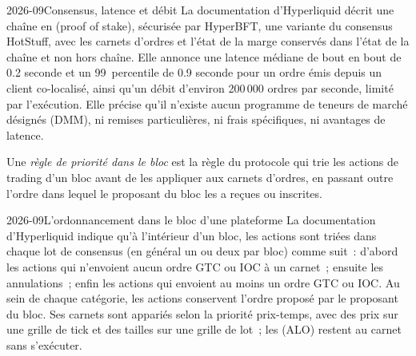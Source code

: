 \begin{dated}{2026-09}{Consensus, latence et débit}\label{dat:m3:on-chain-order-books-and-perpetual-dexs:hl}
La documentation d'Hyperliquid décrit une chaîne en  (proof of stake), sécurisée par HyperBFT, une variante du consensus
HotStuff, avec les carnets d'ordres et l'état de la marge conservés dans l'état de la chaîne et non hors chaîne. Elle annonce une latence médiane
de bout en bout de 0.2 seconde et un 99~percentile de 0.9 seconde pour un ordre émis depuis un client co-localisé, ainsi qu'un
débit d'environ 200\,000 ordres par seconde, limité par l'exécution. Elle précise qu'il n'existe aucun programme de teneurs
de marché désignés (DMM), ni remises particulières, ni frais spécifiques, ni avantages de latence.
\end{dated}

\begin{definition}\label{def:m3:on-chain-order-books-and-perpetual-dexs:priority}
Une \emph{règle de priorité dans le bloc} est la règle du protocole qui trie les actions de trading
d'un bloc avant de les appliquer aux carnets d'ordres, en passant outre l'ordre dans lequel le proposant du bloc les a reçues
ou inscrites.
\end{definition}

\begin{dated}{2026-09}{L'ordonnancement dans le bloc d'une plateforme}\label{dat:m3:on-chain-order-books-and-perpetual-dexs:order}
La documentation d'Hyperliquid indique qu'à l'intérieur d'un bloc, les actions sont triées dans chaque lot de consensus (en
général un ou deux par bloc) comme suit~: d'abord les actions qui n'envoient aucun ordre GTC ou IOC à un carnet~; ensuite les annulations~; enfin les actions qui envoient au
moins un ordre GTC ou IOC. Au sein de chaque catégorie, les actions conservent l'ordre proposé par le proposant du bloc. Ses carnets
sont appariés selon la priorité prix-temps, avec des prix sur une grille de tick et des tailles sur une grille de lot~; les  (ALO) restent au carnet sans s'exécuter.
\end{dated}

